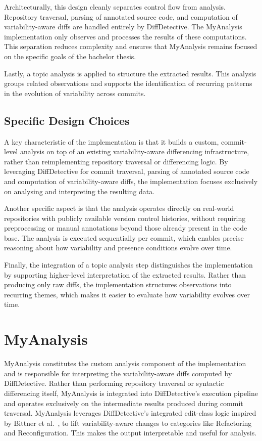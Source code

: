 Architecturally, this design cleanly separates control flow from analysis. Repository traversal, parsing of annotated source code, and computation of variability-aware diffs are handled entirely by DiffDetective. The MyAnalysis implementation only observes and processes the results of these computations. This separation reduces complexity and ensures that MyAnalysis remains focused on the specific goals of the bachelor thesis.

Lastly, a topic analysis is applied to structure the extracted results. This analysis groups related observations and supports the identification of recurring patterns in the evolution of variability across commits.

\subsection{Specific Design Choices}

A key characteristic of the implementation is that it builds a custom, commit-level analysis on top of an existing variability-aware differencing infrastructure, rather than reimplementing repository traversal or differencing logic. By leveraging DiffDetective for commit traversal, parsing of annotated source code and computation of variability-aware diffs, the implementation focuses exclusively on analysing and interpreting the resulting data.

Another specific aspect is that the analysis operates directly on real-world repositories with publicly available version control histories, without requiring preprocessing or manual annotations beyond those already present in the code base. The analysis is executed sequentially per commit, which enables precise reasoning about how variability and presence conditions evolve over time.

Finally, the integration of a topic analysis step distinguishes the implementation by supporting higher-level interpretation of the extracted results. Rather than producing only raw diffs, the implementation structures observations into recurring themes, which makes it easier to evaluate how variability evolves over time.

\section{MyAnalysis}

MyAnalysis constitutes the custom analysis component of the implementation and is responsible for interpreting the variability-aware diffs computed by DiffDetective. Rather than performing repository traversal or syntactic differencing itself, MyAnalysis is integrated into DiffDetective’s execution pipeline and operates exclusively on the intermediate results produced during commit traversal. MyAnalysis leverages DiffDetective’s integrated edit-class logic inspired by Bittner et al.~\cite{Bittner2022_edits}, to lift variability-aware changes to categories like Refactoring and Reconfiguration. This makes the output interpretable and useful for analysis.

